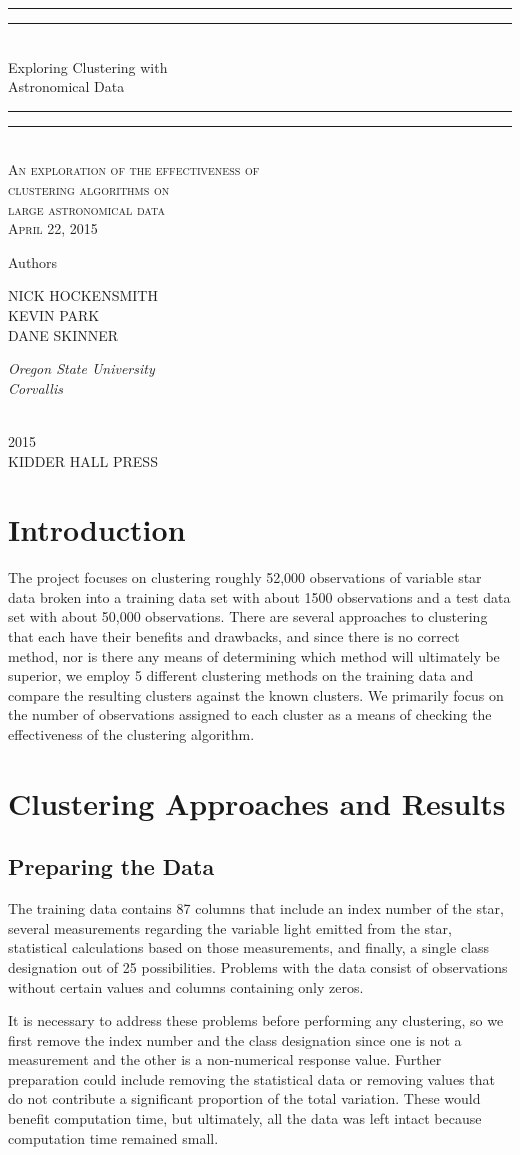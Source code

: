 \documentclass[12pt]{article}
\newcommand*{\plogo}{\fbox{$\mathcal{KHP}$}} %
\newcommand*{\titleGP}{\begingroup %
\centering %
\vspace*{\baselineskip} %

\rule{\textwidth}{1.6pt}\vspace*{-\baselineskip}\vspace*{2pt} %
\rule{\textwidth}{0.4pt}\\[\baselineskip] %

{\LARGE Exploring Clustering with\\[0.3\baselineskip] Astronomical Data}\\[0.2\baselineskip] %

\rule{\textwidth}{0.4pt}\vspace*{-\baselineskip}\vspace{4pt} %
\rule{\textwidth}{1.6pt}\\[\baselineskip] %

\scshape %
An exploration of the effectiveness of \\ clustering algorithms on \\ %
large astronomical data \\[\baselineskip] %
April 22, 2015\par %

\vspace*{2\baselineskip} %

Authors \\[\baselineskip]
{\Large NICK HOCKENSMITH \\ KEVIN PARK \\ DANE SKINNER\par} %
{\itshape Oregon State University \\ Corvallis\par} %

\vfill %

\plogo \\[0.3\baselineskip] %
{\scshape 2015} \\[0.3\baselineskip] %
{\large KIDDER HALL PRESS}\par %

\endgroup}
\begin{document}
 

\pagestyle{empty} %

\titleGP %

\newpage
\tableofcontents

\newpage
\pagestyle{plain}
\section{Introduction}
The project focuses on clustering roughly 52,000 observations of variable star data broken into a training data set with about 1500 observations and a test data set with about 50,000 observations. There are several approaches to clustering that each have their benefits and drawbacks, and since there is no correct method, nor is there any means of determining which method will ultimately be superior, we employ 5 different clustering methods on the training data and compare the resulting clusters against the known clusters.  We primarily focus on the number of observations assigned to each cluster as a means of checking the effectiveness of the clustering algorithm. 

\section{Clustering Approaches and Results}

\subsection{Preparing the Data}
The training data contains 87 columns that include an index number of the star, several measurements regarding the variable light emitted from the star, statistical calculations based on those measurements, and finally, a single class designation out of 25 possibilities.  Problems with the data consist of observations without certain values and columns containing only zeros.

It is necessary to address these problems before performing any clustering,  so  we first remove the index number and the class designation since one is not a measurement and the other is a non-numerical response value.  Further preparation could include removing the statistical data or removing values that do not contribute a significant proportion of the total variation.  These would benefit computation time, but ultimately, all the data was left intact because computation time remained small.  %
\end{document}
